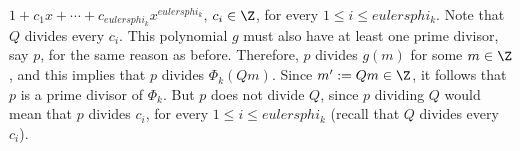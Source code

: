 $1+c_1x+\cdots+c_{{eulersphi_k}}x^{{eulersphi_k}}$, $c_i\in\Z$, for every $1\leqslant i \leqslant {eulersphi_k}$. Note that $Q$ divides every $c_i$. This polynomial $g$ must also have at least one prime divisor, say $p$, for the same reason as before. Therefore, $p$ divides $g(m)$ for some $m\in\Z$, and this implies that $p$ divides $\Phi_{{k}}(Qm)$. Since $m':=Qm\in\Z$, it follows that $p$ is a prime divisor of $\Phi_{{k}}$. But $p$ does not divide $Q$, since $p$ dividing $Q$ would mean that $p$ divides $c_i$, for every $1\leqslant i \leqslant {eulersphi_k}$ (recall that $Q$ divides every $c_i$).